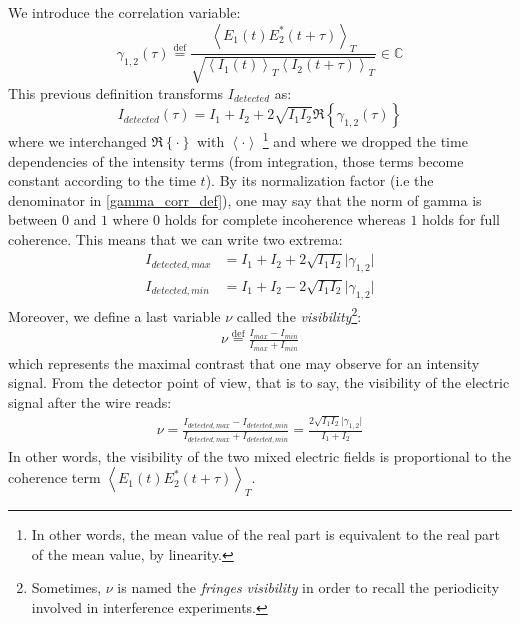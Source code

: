 \documentclass[11pt]{report}
\begin{document}
We introduce the correlation variable:
\begin{equation}
\label{gamma_corr_def}
\gamma_{1,2}(\tau) \stackrel{\text{def}}{=} \frac{\left\langle E_1(t) E_2^*(t + \tau) \right\rangle _T}{\sqrt{\left\langle I_1(t) \right\rangle_T \left\langle I_2(t + \tau) \right\rangle _T }} \in \mathbb{C}
\end{equation}
This previous definition transforms $I_{detected}$ as:
\begin{equation}
I_{detected}(\tau) = I_1 + I_2 + 2\sqrt{I_1 I_2} \Re \left\lbrace \gamma_{1,2}(\tau) \right\rbrace
\end{equation}
where we interchanged $\Re \left\lbrace \cdot \right\rbrace$ with $\left\langle \cdot \right \rangle$ \footnote{In other words, the mean value of the real part is equivalent to the real part of the mean value, by linearity.} and where we dropped the time dependencies of the intensity terms (from integration, those terms become constant according to the time $t$).
By its normalization factor (i.e the denominator in \eqref{gamma_corr_def}), one may say that the norm of gamma is between $0$ and $1$ where $0$ holds for complete incoherence whereas $1$ holds for full coherence. This means that we can write two extrema:
\begin{align}
I_{detected, max} &= I_1 + I_2 + 2\sqrt{I_1 I_2} \vert \gamma_{1,2} \vert\\
I_{detected, min} &= I_1 + I_2 - 2\sqrt{I_1 I_2} \vert \gamma_{1,2} \vert
\end{align}
Moreover, we define a last variable $\nu$ called the \textit{visibility}\footnote{Sometimes, $\nu$ is named the \textit{fringes visibility} in order to recall the periodicity involved in interference experiments.}:
\begin{align}
\label{def_visibility}
\nu \stackrel{\text{def}}{=} \frac{I_{max} - I_{min}}{I_{max} + I_{min}}
\end{align}
which represents the maximal contrast that one may observe for an intensity signal. From the detector point of view, that is to say, the visibility of the electric signal after the wire reads:
\begin{align}
\nu = \frac{I_{detected, max} - I_{detected, min}}{I_{detected, max} + I_{detected, min}} = \frac{2\sqrt{I_1 I_2} \vert \gamma_{1,2} \vert}{I_1 + I_2}
\end{align}
In other words, the visibility of the two mixed electric fields is proportional to the coherence term $\left\langle E_1(t) E_2^*(t + \tau) \right\rangle _T$.
\end{document}
